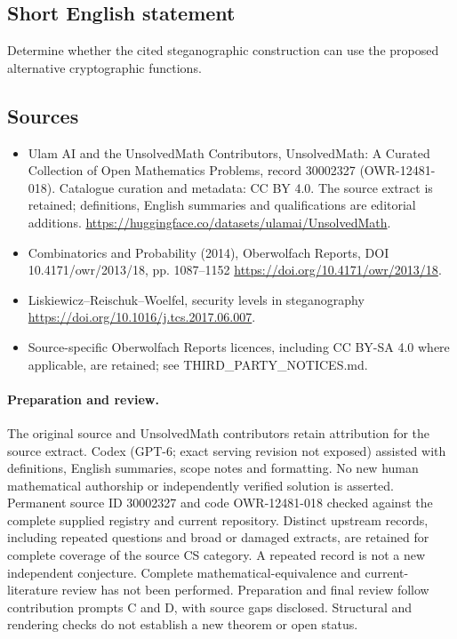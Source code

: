 \documentclass[11pt]{article}
\begin{document}
\subsection{Short English statement}
Determine whether the cited steganographic construction can use the proposed alternative cryptographic functions.
\subsection{Sources}
\begin{itemize}
\item[\hypertarget{source:30002327:1}{S1}] Ulam AI and the UnsolvedMath Contributors, UnsolvedMath: A Curated Collection of Open Mathematics Problems, record 30002327 (OWR-12481-018). Catalogue curation and metadata: CC BY 4.0. The source extract is retained; definitions, English summaries and qualifications are editorial additions.
\url{https://huggingface.co/datasets/ulamai/UnsolvedMath}.
\item[\hypertarget{source:30002327:2}{S2}] Combinatorics and Probability (2014), Oberwolfach Reports, DOI 10.4171/owr/2013/18, pp. 1087--1152
\url{https://doi.org/10.4171/owr/2013/18}.
\item[\hypertarget{source:30002327:3}{S3}] Liskiewicz--Reischuk--Woelfel, security levels in steganography
\url{https://doi.org/10.1016/j.tcs.2017.06.007}.
\item Source-specific Oberwolfach Reports licences, including CC BY-SA 4.0 where applicable, are retained; see THIRD\_PARTY\_NOTICES.md.
\end{itemize}
\paragraph{Preparation and review.}
The original source and UnsolvedMath contributors retain attribution for the source extract. Codex (GPT-6; exact serving revision not exposed) assisted with definitions, English summaries, scope notes and formatting. No new human mathematical authorship or independently verified solution is asserted. Permanent source ID 30002327 and code OWR-12481-018 checked against the complete supplied registry and current repository. Distinct upstream records, including repeated questions and broad or damaged extracts, are retained for complete coverage of the source CS category. A repeated record is not a new independent conjecture. Complete mathematical-equivalence and current-literature review has not been performed. Preparation and final review follow contribution prompts C and D, with source gaps disclosed. Structural and rendering checks do not establish a new theorem or open status.
\label{end:30002327}
\end{document}
